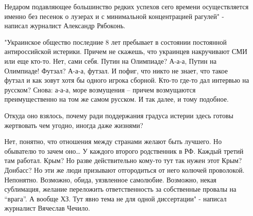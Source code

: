 Недаром подавляющее большинство редких успехов сего времени осуществляется
именно без песенок о лузерах и с минимальной концентрацией рагулей" - написал
журналист Александр Рябоконь.


"Украинское общество последние 8 лет пребывает в состоянии постоянной
антироссийской истерики. Причем не скажешь, что украинцев накручивают СМИ или
еще кто-то. Нет, сами себя. Путин на Олимпиаде? А-а-а, Путин на Олимпиаде!
Футзал? А-а-а, футзал. И пофиг, что никто не знает, что такое футзал и как
зовут хотя бы одного игрока сборной. Кто-то где-то дал интервью на русском?
Снова: а-а-а, море возмущения – причем возмущаются преимущественно на том же
самом русском. И так далее, и тому подобное.

Откуда оно взялось, почему ради поддержания градуса истерии здесь готовы
жертвовать чем угодно, иногда даже жизнями?

Нет, понятно, что отношения между странами желают быть лучшего. Но обывателю то
зачем оно… У каждого второго родственник в РФ. Каждый третий там работал. Крым?
Но разве действительно кому-то тут так нужен этот Крым? Донбасс? Но эти же люди
призывают отгородиться от него колючей проволокой. Непонятно. Возможно, обида,
уязвленное самолюбие. Возможно, некая сублимация, желание переложить
ответственность за собственные провалы на \enquote{врага}. А вообще ХЗ. Тут явно тема
не для одной диссертации" - написал журналист Вячеслав Чечило.


